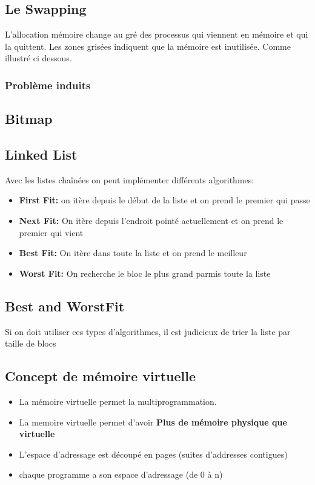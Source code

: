 \subsection{Le Swapping}
L’allocation mémoire change au gré des processus qui viennent en mémoire et qui la quittent. Les zones grisées indiquent que la mémoire est inutilisée. Comme illustré ci dessous.

\subsubsection{Problème induits}

\newpage
\subsection{Bitmap}

\subsection{Linked List} 


Avec les listes chaînées  on peut implémenter différents algorithmes:
\begin{itemize}
    \item \textbf{First Fit: }on itère depuis le début de la liste et on prend le premier qui passe
    \item \textbf{Next Fit: } On itère depuis l'endroit pointé actuellement et on prend le premier qui vient
    \item \textbf{Best Fit: } On itère dans toute la liste et on prend le meilleur
    \item \textbf{Worst Fit: }On recherche le bloc le plus grand parmis toute la liste
\end{itemize}

\subsection{Best and WorstFit}
Si on doit utiliser ces types d'algorithmes, il est judicieux de trier la liste par taille de blocs


\subsection{Concept de mémoire virtuelle}
\begin{itemize}
    \item La mémoire virtuelle permet la multiprogrammation.
    \item La memoire virtuelle permet d'avoir \textbf{Plus de mémoire physique que virtuelle}
    \item L'espace d'adressage est découpé en pages (suites d'addresses contigues)
    \item chaque programme a son espace d'adressage (de 0 à n)
\end{itemize}
